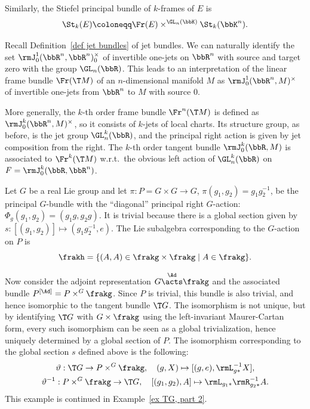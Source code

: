 \begin{example}
\begin{enumerate}
        Similarly, the Stiefel principal bundle of $k$-frames of $E$ is
        \[\St_k(E)\coloneqq \Fr(E)\times^{\GL_n(\bbK)}\St_k(\bbK^n).\]
    \end{enumerate}
\end{example}

\begin{example}
    Recall Definition~\ref{def jet bundles} of jet bundles. We can naturally identify the set $\rmJ^1_0(\bbR^n,\bbR^n)_0^\times$ of invertible one-jets on $\bbR^n$ with source and target zero with the group $\GL_n(\bbR)$. This leads to an interpretation of the linear frame bundle $\Fr(\T M)$ of an $n$-dimensional manifold $M$ as $\rmJ^1_0(\bbR^n,M)^\times$ of invertible one-jets from $\bbR^n$ to $M$ with source $0$.

    More generally, the $k$-th order frame bundle $\Fr^n(\T M)$ is defined as $\rmJ^k_0(\bbR^n,M)^\times$, so it consists of $k$-jets of local charts. Its structure group, as before, is the jet group $\GL^k_n(\bbR)$, and the principal right action is given by jet composition from the right. The $k$-th order tangent bundle $\rmJ^k_0(\bbR,M)$ is associated to $\Fr^k(\T M)$ w.r.t.\ the obvious left action of $\GL^k_n(\bbR)$ on $F=\rmJ^k_0(\bbR,\bbR^n)$.
\end{example}


\begin{example}\label{ex TG, part 1}
    Let $G$ be a real Lie group and let $\pi:P=G\times G\to G$, $\pi(g_1,g_2)=g_1g_2^{-1}$, be the principal $G$-bundle with the ``diagonal'' principal right $G$-action: $\Phi_g(g_1,g_2)=(g_1g,g_2g)$.  It is trivial because there is a global section given by $s:[(g_1,g_2)]\mapsto (g_1g_2^{-1},e)$. The Lie subalgebra corresponding to the $G$-action on $P$ is 
    \[\frakh=\{(A,A)\in \frakg\times\frakg\mid A\in\frakg\}.\]

    Now consider the adjoint representation $G\overset{\Ad}{\acts}\frakg$ and the associated bundle $P^{[\Ad]}=P\times^G \frakg$. Since $P$ is trivial, this bundle is also trivial, and hence isomorphic to the tangent bundle $\T G$. The isomorphism is not unique, but by identifying $\T G$ with $G\times\frakg$ using the left-invariant Maurer-Cartan form, every such isomorphism can be seen as a global trivialization, hence uniquely determined by a global section of $P$. The isomorphism corresponding to the global section $s$ defined above is the following:
    \begin{gather}
    	\vartheta: \T G\to P \times^G \frakg,\quad (g,X)\mapsto [(g,e),\rmL_{g\ast}^{-1}X],\\
    	\vartheta^{-1}: P\times^G \frakg\to \T G,\quad [(g_1,g_2),A]\mapsto \rmL_{g_1\ast}\rmR_{g_2\ast}^{-1}  A.
    \end{gather}
    This example is continued in Example~\ref{ex TG, part 2}.
\end{example}


